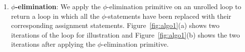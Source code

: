 \begin{enumerate}

\item {\bf $\phi$-elimination}: We apply the $\phi$-elimination primitive on an unrolled loop to return a loop in which all the $\phi$-statements have been replaced with their corresponding assignment statements. Figure~\ref{fig:algo1}(a) shows two iterations of the loop for illustration and Figure~\ref{fig:algo1}(b) shows the two iterations after applying the $\phi$-elimination primitive.


\end{enumerate}
